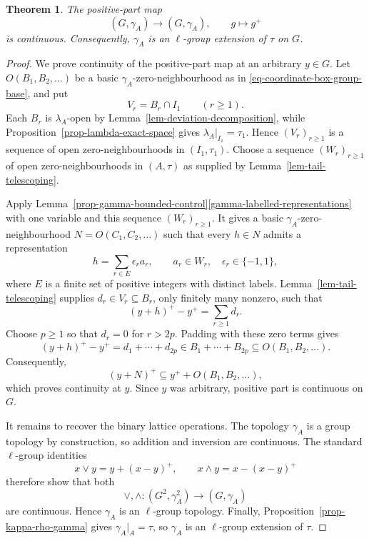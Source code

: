 \documentclass[preprint,3p]{elsarticle}
\theoremstyle{plain}
\newtheorem{thm}{Theorem}[section]
\theoremstyle{definition}
\numberwithin{equation}{section}
\begin{document}
\begin{thm}
\label{thm-rho-lgroup}
The positive-part map
\begin{equation}
\label{eq-positive-part-map-rho-square}
 (G,\gamma_A)\longrightarrow(G,\gamma_A),
 \qquad g\mapsto g^+
\end{equation}
is continuous.  Consequently, $\gamma_A$ is an $\ell$-group
extension of $\tau$ on $G$.
\end{thm}

\begin{proof}
We prove continuity of the positive-part map at an arbitrary $y\in G$.
Let $O(B_1,B_2,\ldots)$ be a basic $\gamma_A$-zero-neighbourhood as in
\eqref{eq-coordinate-box-group-base}, and put
\begin{equation}
\label{eq-positive-part-control-neighbourhood}
V_r=B_r\cap I_1
\qquad(r\geq1).
\end{equation}
Each $B_r$ is $\lambda_A$-open by
Lemma~\ref{lem-deviation-decomposition}, while
Proposition~\ref{prop-lambda-exact-space} gives
$\lambda_A|_{I_1}=\tau_1$.  Hence $(V_r)_{r\geq1}$ is a sequence of
open zero-neighbourhoods in $(I_1,\tau_1)$.  
Choose a sequence $(W_r)_{r\geq1}$ of open zero-neighbourhoods in
$(A,\tau)$ as supplied by Lemma~\ref{lem-tail-telescoping}.

Apply Lemma~\ref{prop-gamma-bounded-control}\ref{gamma-labelled-representations}
with one variable and this
sequence $(W_r)_{r\geq1}$.
It gives a basic $\gamma_A$-zero-neighbourhood
$N=O(C_1,C_2,\ldots)$ such that every $h\in N$ admits a representation
\begin{equation}
\label{eq-source-neighbourhood-labeling}
 h=\sum_{r\in E}\epsilon_r a_r,
 \qquad a_r\in W_r,\quad\epsilon_r\in\{-1,1\},
\end{equation}
where $E$ is a finite set of positive integers with distinct labels.
Lemma~\ref{lem-tail-telescoping} supplies $d_r\in V_r\subseteq B_r$,
only finitely many nonzero, such that
\[
 (y+h)^+-y^+=\sum_{r\geq1}d_r.
\]
Choose $p\geq1$ so that $d_r=0$ for $r>2p$.
Padding with these zero terms gives
\[
 (y+h)^+-y^+
 =d_1+\cdots+d_{2p}
 \in B_1+\cdots+B_{2p}
 \subseteq O(B_1,B_2,\ldots).
\]
Consequently,
\[
 (y+N)^+\subseteq y^++O(B_1,B_2,\ldots),
\]
which proves continuity at $y$.
Since $y$ was arbitrary, positive part is continuous on $G$.

It remains to recover the binary lattice operations.  The topology $\gamma_A$ is a group topology by construction,
so addition and inversion are continuous.  The standard
$\ell$-group identities
\begin{equation}
\label{eq-lattice-operations-positive-part}
 x\vee y=y+(x-y)^+,
 \qquad
 x\wedge y=x-(x-y)^+
\end{equation}
therefore show that both
\[
 \vee,\wedge\colon
 (G^2,\gamma_A^2)
 \longrightarrow
 (G,\gamma_A)
\]
are continuous.  Hence $\gamma_A$ is an $\ell$-group topology.
Finally, Proposition~\ref{prop-kappa-rho-gamma} gives
$\gamma_A|_A=\tau$, so $\gamma_A$ is an $\ell$-group
extension of $\tau$.
\end{proof}
\end{document}
